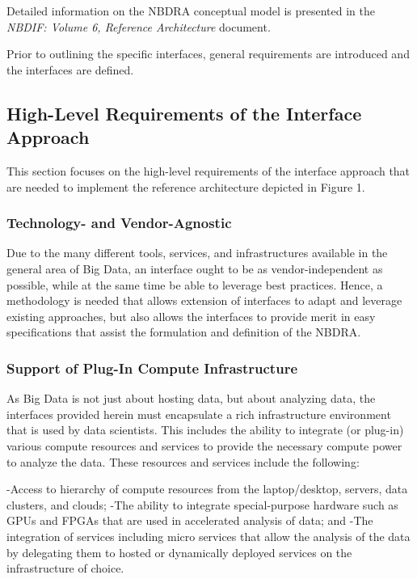 \documentclass[9pt,]{article}
\begin{document}
Detailed information on the NBDRA conceptual model is presented in the
\emph{NBDIF: Volume 6, Reference Architecture} document.

Prior to outlining the specific interfaces, general requirements are
introduced and the interfaces are defined.

\hypertarget{high-level-requirements-of-the-interface-approach}{%
\subsection{High-Level Requirements of the Interface
Approach}\label{high-level-requirements-of-the-interface-approach}}

This section focuses on the high-level requirements of the interface
approach that are needed to implement the reference architecture
depicted in Figure 1.

\hypertarget{technology--and-vendor-agnostic}{%
\subsubsection{Technology- and
Vendor-Agnostic}\label{technology--and-vendor-agnostic}}

Due to the many different tools, services, and infrastructures available
in the general area of Big Data, an interface ought to be as
vendor-independent as possible, while at the same time be able to
leverage best practices. Hence, a methodology is needed that allows
extension of interfaces to adapt and leverage existing approaches, but
also allows the interfaces to provide merit in easy specifications that
assist the formulation and definition of the NBDRA.

\hypertarget{support-of-plug-in-compute-infrastructure}{%
\subsubsection{Support of Plug-In Compute
Infrastructure}\label{support-of-plug-in-compute-infrastructure}}

As Big Data is not just about hosting data, but about analyzing data,
the interfaces provided herein must encapsulate a rich infrastructure
environment that is used by data scientists. This includes the ability
to integrate (or plug-in) various compute resources and services to
provide the necessary compute power to analyze the data. These resources
and services include the following:

-Access to hierarchy of compute resources from the laptop/desktop,
servers, data clusters, and clouds; -The ability to integrate
special-purpose hardware such as GPUs and FPGAs that are used in
accelerated analysis of data; and -The integration of services including
micro services that allow the analysis of the data by delegating them to
hosted or dynamically deployed services on the infrastructure of choice.
\end{document}

